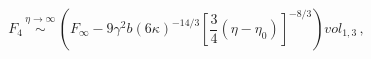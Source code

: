 \begin{equation}
F_{4}\, \stackrel{\eta \rightarrow \infty }{\sim }\, \left( F_{\infty }-9\gamma ^{2}b(6\kappa )^{-14/3}[\frac{3}{4}(\eta -\eta _{0})]^{-8/3}\right) vol_{1,3}\, ,
\end{equation}

